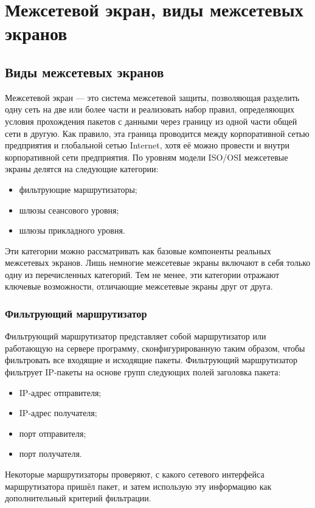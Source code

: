 \graphicspath{{images/}}



\chapter{Межсетевой экран, виды межсетевых экранов}
\section{Виды межсетевых экранов}
Межсетевой экран --- это система межсетевой защиты, позволяющая
разделить одну сеть на две или более части и реализовать набор правил,
определяющих условия прохождения пакетов с данными через границу из
одной части общей сети в другую. Как правило, эта граница проводится
между корпоративной сетью предприятия и глобальной сетью Internet,
хотя её можно провести и внутри корпоративной сети предприятия.  По
уровням модели ISO/OSI межсетевые экраны делятся на следующие
категории:
\begin{itemize}
\item фильтрующие маршрутизаторы;
\item шлюзы сеансового уровня;
\item шлюзы прикладного уровня.
\end{itemize}
Эти категории можно рассматривать как базовые компоненты реальных
межсетевых экранов. Лишь немногие межсетевые экраны включают в себя
только одну из перечисленных категорий. Тем не менее, эти категории
отражают ключевые возможности, отличающие межсетевые экраны друг от
друга.

\subsection{Фильтрующий маршрутизатор }
Фильтрующий маршрутизатор представляет собой маршрутизатор или
работающую на сервере программу, сконфигурированную таким образом,
чтобы фильтровать все входящие и исходящие пакеты.  Фильтрующий
маршрутизатор фильтрует IP-пакеты на основе групп следующих полей
заголовка пакета:

\begin{itemize}
\item IP-адрес отправителя;
\item IP-адрес получателя;
\item порт отправителя;
\item порт получателя.
\end{itemize}

Некоторые маршрутизаторы проверяют, с какого сетевого интерфейса
маршрутизатора пришёл пакет, и затем использую эту информацию как
дополнительный критерий фильтрации.

